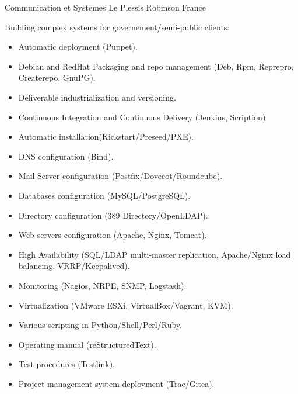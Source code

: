 \documentclass[10pt,a4paper,sans]{moderncv}        %
\begin{document}
        {Communication et Systèmes}
        {Le Plessis Robinson}
        {France}
        {Building complex systems for governement/semi-public clients:
        \begin{itemize}
        \item Automatic deployment (Puppet).
        \item Debian and RedHat Packaging and repo management (Deb, Rpm, Reprepro, Createrepo, GnuPG).
        \item Deliverable industrialization and versioning.
		\item Continuous Integration and Continuous Delivery (Jenkins, Scription)
        \item Automatic installation(Kickstart/Preseed/PXE).
        \item DNS configuration (Bind).
        \item Mail Server configuration (Postfix/Dovecot/Roundcube).
        \item Databases configuration (MySQL/PostgreSQL).
        \item Directory configuration (389 Directory/OpenLDAP).
        \item Web servers configuration (Apache, Nginx, Tomcat).
        \item High Availability (SQL/LDAP multi-master replication, Apache/Nginx load balancing, VRRP/Keepalived).
        \item Monitoring (Nagios, NRPE, SNMP, Logstash).
        \item Virtualization (VMware ESXi, VirtualBox/Vagrant, KVM).
        \item Various scripting in Python/Shell/Perl/Ruby.
        \item Operating manual (reStructuredText).
        \item Test procedures (Testlink).
        \item Project management system deployment (Trac/Gitea).
        \end{itemize}
        }
\end{document}
